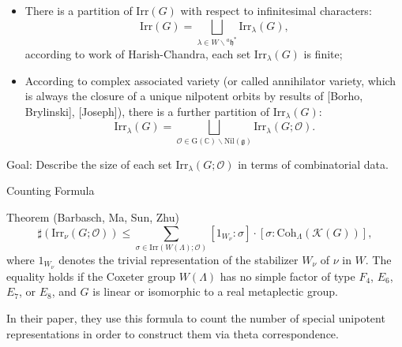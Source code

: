 \documentclass[fleqn,xcolor=dvipsnames]{beamer}
\newcommand{\BC}{{\mathbb {C}}}
\newcommand{\CK}{{\mathcal {K}}}
\newcommand{\CO}{{\mathcal {O}}}
\newcommand{\RG}{{\mathrm {G}}}
\newcommand{\fg}{\mathfrak{g}}
\newcommand{\fh}{\mathfrak{h}}
\newcommand{\Irr}{{\mathrm{Irr}}}
\newcommand{\Nil}{{\mathrm{Nil}}}
\begin{document}
\begin{frame}

  \begin{itemize}
    \item There is a partition of $\Irr(G)$ with respect to infinitesimal characters:
  \[\Irr(G) = \bigsqcup_{\lambda \in W \backslash {^{a}\fh}^*} \Irr_{\lambda}(G),
  \]
  according to work of Harish-Chandra, each set $\Irr_{\lambda}(G)$ is finite;
  \item According to complex associated variety (or called annihilator variety, which is always the closure of a unique nilpotent orbits by results of [Borho, Brylinski], [Joseph]), there is a further partition of $\Irr_{\lambda}(G)$:
  \[\Irr_{\lambda}(G) = \bigsqcup_{\CO \in \RG(\BC)\backslash \Nil(\fg)}\Irr_{\lambda}(G;\CO).\]
  \end{itemize}

Goal: Describe the size of each set $\Irr_{\lambda}(G;\CO)$ in terms of combinatorial data.
\end{frame}






\begin{frame}{Counting Formula}
\begin{block}{Theorem (Barbasch, Ma, Sun, Zhu)}
  \begin{equation*}
        \sharp(\Irr_{\nu}(G;\CO)) \leq \sum_{\sigma \in \Irr(W(\Lambda);\CO)} [1_{W_\nu}:\sigma] \cdot [\sigma:\mathrm{Coh}_{\Lambda}(\CK(G))],
    \end{equation*}
    where $1_{W_\nu}$ denotes the trivial representation of the stabilizer $W_\nu$ of $\nu$ in $W$. The equality holds if the Coxeter group $W(\Lambda)$ has no simple factor of type $F_4$, $E_6$, $E_7$, or $E_8$, and $G$ is linear or isomorphic to a real metaplectic group.
\end{block}

In their paper, they use this formula to count the number of special unipotent representations in order to construct them via theta correspondence.

\end{frame}
\end{document}
